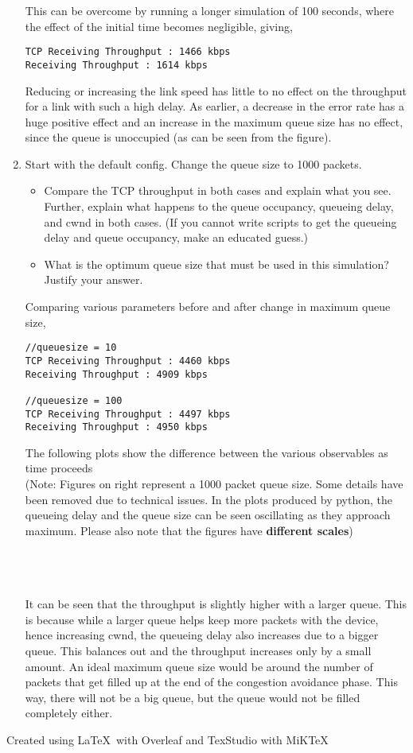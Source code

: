 \documentclass[a4paper]{article}
\begin{document}
\begin{enumerate}
This can be overcome by running a longer simulation of 100 seconds, where the effect of the initial time becomes negligible, giving,
\begin{verbatim}
TCP Receiving Throughput : 1466 kbps
Receiving Throughput : 1614 kbps
\end{verbatim}

Reducing or increasing the link speed has little to no effect on the throughput for a link with such a high delay. As earlier, a decrease in the error rate has a huge positive effect and an increase in the maximum queue size has no effect, since the queue is unoccupied (as can be seen from the figure).

\item Start with the default config. Change the queue size to 1000 packets.
\begin{itemize}
	\item Compare the TCP throughput in both cases and explain what you see. Further, explain what happens to the queue occupancy, queueing delay, and cwnd in both cases. (If you cannot write scripts to get the queueing delay and queue occupancy, make an educated guess.) 
	\item What is the optimum queue size that must be used in this simulation? Justify your answer. 
\end{itemize}

Comparing various parameters before and after change in maximum queue size,\\

\begin{verbatim}
//queuesize = 10
TCP Receiving Throughput : 4460 kbps
Receiving Throughput : 4909 kbps

//queuesize = 100
TCP Receiving Throughput : 4497 kbps
Receiving Throughput : 4950 kbps
\end{verbatim}

The following plots show the difference between the various observables as time proceeds\\
(Note: Figures on right represent a 1000 packet queue size. Some details have been removed due to technical issues. In the plots produced by python, the queueing delay and the queue size can be seen oscillating as they approach maximum. Please also note that the figures have \textbf{different scales})

\\
\\
\\

It can be seen that the throughput is slightly higher with a larger queue. This is because while a larger queue helps keep more packets with the device, hence increasing cwnd, the queueing delay also increases due to a bigger queue. This balances out and the throughput increases only by a small amount. An ideal maximum queue size would be around the number of packets that get filled up at the end of the congestion avoidance phase. This way, there will not be a big queue, but the queue would not be filled completely either.
\end{enumerate}

  \begin{center}
  Created using \LaTeX \ with Overleaf and TexStudio with MiKTeX
  \end{center}
  
\end{document}

